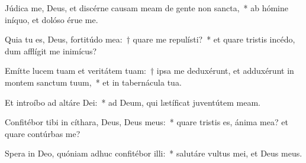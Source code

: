 \item Júdica me, Deus, et discérne causam meam de gente non sancta,~* ab hómine iníquo, et dolóso érue me.

\item Quia tu es, Deus, fortitúdo mea:~† quare me repulísti?~* et quare tristis incédo, dum afflígit me inimícus?

\item Emítte lucem tuam et veritátem tuam:~† ipsa me deduxérunt, et adduxérunt in montem sanctum tuum,~* et in tabernácula tua.

\item Et introíbo ad altáre Dei:~* ad Deum, qui lætíficat juventútem meam.

\item Confitébor tibi in cíthara, Deus, Deus meus:~* quare tristis es, ánima mea? et quare contúrbas me?

\item Spera in Deo, quóniam adhuc confitébor illi:~* salutáre vultus mei, et Deus meus.

